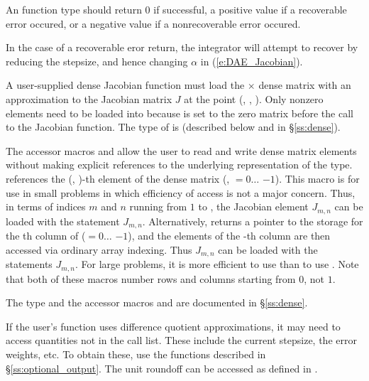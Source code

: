 {
  An  function type should return $0$ if successful,
  a positive value if a recoverable error occured, or a negative value
  if a nonrecoverable error occured. 

  In the case of a recoverable eror return, 
  the integrator will attempt to recover by reducing the stepsize,
  and hence changing $\alpha$ in (\ref{e:DAE_Jacobian}).
}
{
  A user-supplied dense Jacobian function must load the  $\times$ 
  dense matrix  with an approximation to the Jacobian matrix $J$
  at the point (, , ).  Only nonzero elements need to be loaded
  into  because  is set to the zero matrix before the call
  to the Jacobian function. The type of  is  
  (described below and in \S\ref{ss:dense}). 
  
  The accessor macros  and  allow the user to
  read and write dense matrix elements without making explicit
  references to the underlying representation of the 
  type.  references the (, )-th
  element of the dense matrix  (, $= 0\ldots$ $-1$).
  This macro is for use in small problems in which efficiency of access is not a
  major concern.  Thus, in terms of indices $m$ and $n$ running from $1$ to
  , the Jacobian element $J_{m,n}$ can be loaded with the statement
   $J_{m,n}$.  Alternatively,
   returns a pointer to the storage for
  the th column of  ($= 0\ldots$ $-1$), and the 
  elements of the -th column
  are then accessed via ordinary array indexing.  Thus $J_{m,n}$ can be 
  loaded with the statements 
   $J_{m,n}$.  For large problems, it is more 
  efficient to use  than to use . 
  Note that both of these macros number rows and columns
  starting from $0$, not $1$.  

  The  type and the accessor macros  and 
   are documented in \S\ref{ss:dense}.

  If the user's  function uses difference quotient approximations,
  it may need to access quantities not in the call list. These include the current
  stepsize, the error weights, etc. To obtain these, use the  functions 
  described in \S\ref{ss:optional_output}. The unit roundoff can be accessed
  as  defined in .

}
